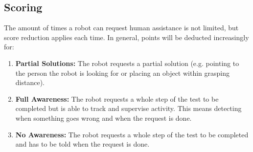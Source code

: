 \subsection{Scoring}
\label{sec:rules:demscoring}
The amount of times a robot can request human assistance is not limited, but score reduction applies each time. 
In general, points will be deducted increasingly for:
\begin{enumerate}
 	\item \textbf{Partial Solutions:} The robot requests a partial solution (e.g. pointing to the person the robot is looking for or placing an object within grasping distance).
 	
 	\item \textbf{Full Awareness:} The robot requests a whole step of the test to be completed but is able to track and supervise activity. This means detecting when something goes wrong and when the request is done.
 	
 	\item \textbf{No Awareness:} The robot requests a whole step of the test to be completed and has to be told when the request is done.
\end{enumerate}





